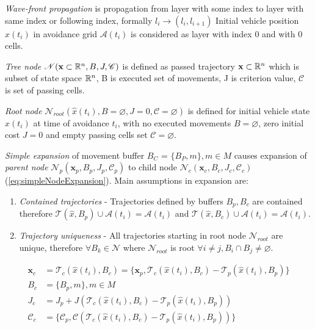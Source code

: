 \emph{Wave-front propagation} is propagation from layer with some index to layer with same index or following index, formally $l_i\to(l_i,l_{i+1})$ Initial vehicle position $\hat{x}(t_i)$ in avoidance grid $\mathscr{A}(t_i)$ is considered as layer with index 0 and with 0 cells.

\emph{Tree node} $\mathscr{N}(\textbf{x}\subset\mathbb{R}^n,B,J,\mathscr{C})$ is defined as passed trajectory $\textbf{x}\subset\mathbb{R}^n$ which is subset of state space $\mathbb{R}^n$, B is executed set of movements, J is criterion value, $\mathscr{C}$ is set of passing cells. 

\emph{Root node} $\mathscr{N}_{root}(\hat{x}(t_i),B=\varnothing,J=0,\mathscr{C}=\varnothing)$ is defined for initial vehicle state $\hat{x}(t_i)$ at time of avoidance $t_i$, with no executed movements $B=\varnothing$, zero initial cost $J=0$ and empty passing cells set $\mathscr{C}=\varnothing$.

\emph{Simple expansion} of movement buffer $B_C$ = $\{B_P,m\},m\in M$ causes expansion of \emph{parent node} $\mathscr{N}_p(\textbf{x}_p,B_p,J_p,\mathscr{C}_p)$ to child node $\mathscr{N}_c(\textbf{x}_c,B_c,J_c,\mathscr{C}_c)$ (\ref{eq:simpleNodeExpansion}). Main assumptions in expansion are:
\begin{enumerate}
    \item \emph{Contained trajectories} - Trajectories defined by buffers $B_p, B_c$ are contained therefore $\mathscr{T}(\hat{x},B_p)\cup\mathscr{A}(t_i)=\mathscr{A}(t_i)$ and 
    $\mathscr{T}(\hat{x},B_c)\cup\mathscr{A}(t_i)=\mathscr{A}(t_i)$.
    \item \emph{Trajectory uniqueness} - All trajectories starting in root node $\mathscr{N}_{root}$ are unique, therefore $\forall B_k\in \mathscr{N}$ where $\mathscr{N}_{root}$ is root $\forall i\neq j, B_i\cap B_j \neq \varnothing$.
\end{enumerate}
\begin{equation}\label{eq:simpleNodeExpansion}
    \begin{aligned}
    \textbf{x}_c &= \mathscr{T}_c(\hat{x}(t_i),B_c) = \{\textbf{x}_p, \mathscr{T}_c(\hat{x}(t_i),B_c)-\mathscr{T}_p(\hat{x}(t_i),B_p)\}\\
    B_c&=\{B_p,m\},m\in M\\
    J_c&=J_p+J(\mathscr{T}_c(\hat{x}(t_i),B_c)-\mathscr{T}_p(\hat{x}(t_i),B_p))\\
    \mathscr{C}_c&=\{\mathscr{C}_p, \mathscr{C}(\mathscr{T}_c(\hat{x}(t_i),B_c)-\mathscr{T}_p(\hat{x}(t_i),B_p))\}
    \end{aligned}
\end{equation}


